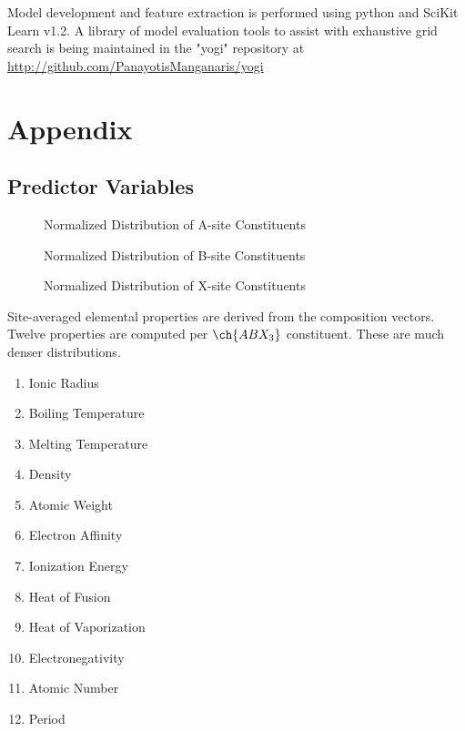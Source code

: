 \documentclass[aip, jmp, amsmath, amssymb]{revtex4-2}
\begin{document}
Model development and feature extraction is performed using python and
SciKit Learn v1.2. A library of model evaluation tools to assist with
exhaustive grid search is being maintained in the "yogi" repository at
\url{http://github.com/PanayotisManganaris/yogi}

\section*{}
\label{sec:org55afacd}
\pagebreak


\printglossaries

\section*{Appendix}
\label{sec:org8655779}
\subsection*{Predictor Variables}
\label{sec:orga229708}
 
\begin{figure}[htbp]
\centering

\caption{Normalized Distribution of A-site Constituents}
\end{figure}

 
\begin{figure}[htbp]
\centering

\caption{Normalized Distribution of B-site Constituents}
\end{figure}

 
\begin{figure}[htbp]
\centering

\caption{Normalized Distribution of X-site Constituents}
\end{figure}

Site-averaged elemental properties are derived from the composition
vectors. Twelve properties are computed per \(\ch{ABX_3}\)
constituent. These are much denser distributions.
\begin{enumerate}
\item Ionic Radius
\item Boiling Temperature
\item Melting Temperature
\item Density
\item Atomic Weight
\item Electron Affinity
\item Ionization Energy
\item Heat of Fusion
\item Heat of Vaporization
\item Electronegativity
\item Atomic Number
\item Period
\end{enumerate}
\end{document}
